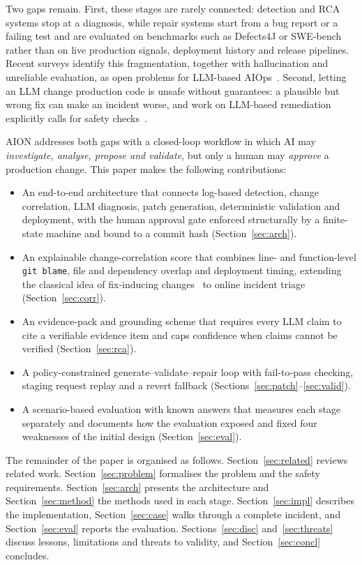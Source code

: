 \documentclass[conference]{IEEEtran}
\begin{document}
Two gaps remain. First, these stages are rarely connected: detection and RCA systems stop at a diagnosis, while repair systems start from a bug report or a failing test and are evaluated on benchmarks such as Defects4J or SWE-bench~\cite{jimenez2024swebench} rather than on live production signals, deployment history and release pipelines. Recent surveys identify this fragmentation, together with hallucination and unreliable evaluation, as open problems for LLM-based AIOps~\cite{zhang2026aiopsllm,ma2026llm4log}. Second, letting an LLM change production code is unsafe without guarantees: a plausible but wrong fix can make an incident worse, and work on LLM-based remediation explicitly calls for safety checks~\cite{integrating2025llmobs}.

AION addresses both gaps with a closed-loop workflow in which AI may \emph{investigate, analyse, propose and validate}, but only a human may \emph{approve} a production change. This paper makes the following contributions:
\begin{itemize}
\item An end-to-end architecture that connects log-based detection, change correlation, LLM diagnosis, patch generation, deterministic validation and deployment, with the human approval gate enforced structurally by a finite-state machine and bound to a commit hash (Section~\ref{sec:arch}).
\item An explainable change-correlation score that combines line- and function-level \texttt{git blame}, file and dependency overlap and deployment timing, extending the classical idea of fix-inducing changes~\cite{sliwerski2005changes} to online incident triage (Section~\ref{sec:corr}).
\item An evidence-pack and grounding scheme that requires every LLM claim to cite a verifiable evidence item and caps confidence when claims cannot be verified (Section~\ref{sec:rca}).
\item A policy-constrained generate--validate--repair loop with fail-to-pass checking, staging request replay and a revert fallback (Sections~\ref{sec:patch}--\ref{sec:valid}).
\item A scenario-based evaluation with known answers that measures each stage separately and documents how the evaluation exposed and fixed four weaknesses of the initial design (Section~\ref{sec:eval}).
\end{itemize}

The remainder of the paper is organised as follows. Section~\ref{sec:related} reviews related work. Section~\ref{sec:problem} formalises the problem and the safety requirements. Section~\ref{sec:arch} presents the architecture and Section~\ref{sec:method} the methods used in each stage. Section~\ref{sec:impl} describes the implementation, Section~\ref{sec:case} walks through a complete incident, and Section~\ref{sec:eval} reports the evaluation. Sections~\ref{sec:disc} and~\ref{sec:threats} discuss lessons, limitations and threats to validity, and Section~\ref{sec:concl} concludes.
\end{document}
